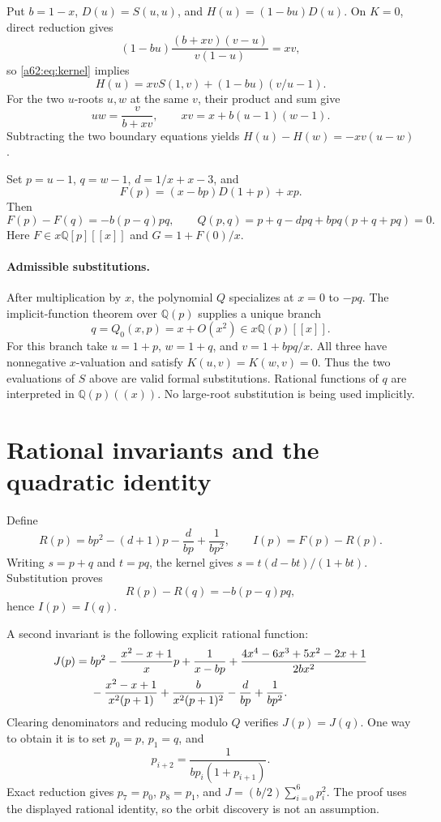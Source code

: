\documentclass[11pt,letterpaper]{article}
\theoremstyle{remark}\newtheorem{remark}[theorem]{Remark}
\newcommand{\Q}{\mathbb Q}
\begin{document}
Put $b=1-x$, $D(u)=S(u,u)$, and $H(u)=(1-bu)D(u)$. On $K=0$, direct reduction gives
\[
 (1-bu)\frac{(b+xv)(v-u)}{v(1-u)}=xv,
\]
so \eqref{a62:eq:kernel} implies
\[
 H(u)=xvS(1,v)+(1-bu)(v/u-1).
\]
For the two $u$-roots $u,w$ at the same $v$, their product and sum give
\[
 uw=\frac{v}{b+xv},\qquad xv=x+b(u-1)(w-1).
\]
Subtracting the two boundary equations yields $H(u)-H(w)=-xv(u-w)$.

Set $p=u-1$, $q=w-1$, $d=1/x+x-3$, and
\begin{equation}\label{a62:eq:F}
 F(p)=(x-bp)D(1+p)+xp.
\end{equation}
Then
\begin{equation}\label{a62:eq:reduced}
 F(p)-F(q)=-b(p-q)pq,
 \qquad Q(p,q)=p+q-dpq+bpq(p+q+pq)=0.
\end{equation}
Here $F\in x\Q[p][[x]]$ and $G=1+F(0)/x$.

\paragraph{Admissible substitutions.}
After multiplication by $x$, the polynomial $Q$ specializes at $x=0$ to $-pq$. The implicit-function theorem over $\Q(p)$ supplies a unique branch
\[
 q=Q_0(x,p)=x+O(x^2)\in x\Q(p)[[x]].
\]
For this branch take $u=1+p$, $w=1+q$, and $v=1+bpq/x$. All three have nonnegative $x$-valuation and satisfy $K(u,v)=K(w,v)=0$. Thus the two evaluations of $S$ above are valid formal substitutions. Rational functions of $q$ are interpreted in $\Q(p)((x))$. No large-root substitution is being used implicitly.

\section{Rational invariants and the quadratic identity}\label{a62:sec:inv}
Define
\[
 R(p)=bp^2-(d+1)p-\frac{d}{bp}+\frac1{bp^2},\qquad I(p)=F(p)-R(p).
\]
Writing $s=p+q$ and $t=pq$, the kernel gives $s=t(d-bt)/(1+bt)$. Substitution proves
\[
 R(p)-R(q)=-b(p-q)pq,
\]
hence $I(p)=I(q)$.

A second invariant is the following explicit rational function:
\begin{align}\label{a62:eq:J}
J(p)={}&bp^2-\frac{x^2-x+1}{x}p+\frac1{x-bp}
 +\frac{4x^4-6x^3+5x^2-2x+1}{2bx^2}\notag\\
&-\frac{x^2-x+1}{x^2(p+1)}+\frac b{x^2(p+1)^2}
 -\frac d{bp}+\frac1{bp^2}.
\end{align}
Clearing denominators and reducing modulo $Q$ verifies $J(p)=J(q)$. One way to obtain it is to set $p_0=p$, $p_1=q$, and
\[
 p_{i+2}=\frac1{bp_i(1+p_{i+1})}.
\]
Exact reduction gives $p_7=p_0$, $p_8=p_1$, and $J=(b/2)\sum_{i=0}^6p_i^2$. The proof uses the displayed rational identity, so the orbit discovery is not an assumption.
\end{document}
